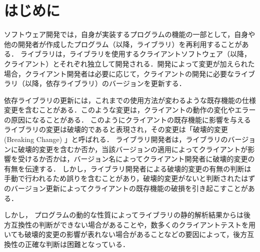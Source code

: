 \documentclass[submit]{ipsj}
\begin{document}
\section{はじめに}
ソフトウェア開発では，自身が実装するプログラムの機能の一部として，自身や他の開発者が作成したプログラム（以降，ライブラリ）を再利用することがある．
ライブラリは，ライブラリを使用するクライアントソフトウェア（以降，クライアント）とそれぞれ独立して開発される．開発によって変更が加えられた場合，クライアント開発者は必要に応じて，クライアントの開発に必要なライブラリ（以降，依存ライブラリ）のバージョンを更新する．


依存ライブラリの更新には，これまでの使用方法が変わるような既存機能の仕様変更を含むことがある．このような変更は，クライアントの動作の変化やエラーの原因になることがある．
このようにクライアントの既存機能に影響を与えるライブラリの変更は破壊的であると表現され，その変更は「破壊的変更 (Breaking Change) 」と呼ばれる．
ライブラリ開発者は，ライブラリのバージョンに破壊的変更を含むか否か，当該バージョンの適用によってクライアントが影響を受けるか否かは，バージョン名によってクライアント開発者に破壊的変更の有無を伝達する．
しかし，ライブラリ開発者による破壊的変更の有無の判断は手動で行われるため誤りを含むことがあり，破壊的変更がないと判断されたはずのバージョン更新によってクライアントの既存機能の破損を引き起こすことがある．

しかし，
プログラムの動的な性質によってライブラリの静的解析結果からは後方互換性の判断ができない場合があることや，数多くのクライアントテストを用いても破壊的変更の影響が表れない場合があることなどの要因によって，後方互換性の正確な判断は困難となっている．
\end{document}
